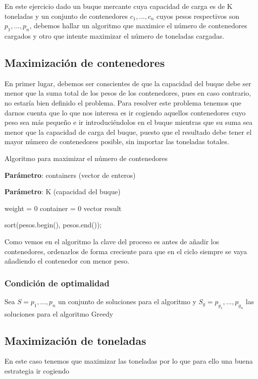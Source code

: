 En este ejercicio dado un buque mercante cuya capacidad de carga es de K toneladas y un conjunto de contenedores $c_1,...,c_n$ cuyos
pesos respectivos son $p_1,...,p_n$, debemos hallar un algoritmo que maximice el número de contenedores cargados y otro que intente 
maximizar el número de toneladas cargadas.

\subsection{Maximización de contenedores}

En primer lugar, debemos ser conscientes de que la capacidad del buque debe ser menor que la suma total de los pesos 
de los contenedores, pues en caso contrario, no estaría bien definido el problema. Para resolver este problema tenemos que darnos cuenta
que lo que nos interesa es ir cogiendo aquellos contenedores cuyo peso sea más pequeño e ir introduciéndolos en el buque mientras que su suma 
sea menor que la capacidad de carga del buque, puesto que el resultado debe tener el mayor número de contenedores posible, sin importar las 
toneladas totales. 

\begin{algorithm}[H]
    \caption{Algoritmo para maximizar el número de contenedores}\label{alg:max_containers}
    \begin{minipage}{0.92\textwidth}
    \textbf{Parámetro}: containers (vector de enteros)

    \textbf{Parámetro}: K (capacidad del buque)

    \end{minipage}

    weight = 0\;
	container = 0\;
    vector result\;
  
    sort(pesos.begin(), pesos.end());

  
    
\end{algorithm}

Como vemos en el algoritmo la clave del proceso es antes de añadir los contenedores, ordenarlos de forma creciente para que 
en el ciclo siempre se vaya añadiendo el contenedor con menor peso.

\subsubsection{Condición de optimalidad}
Sea $S = {p_1,...,p_n}$ un conjunto de soluciones para el algoritmo y $S_g = {p_{g_1},...,p_{g_n}}$ las soluciones para el algoritmo Greedy

\subsection{Maximización de toneladas}
En este caso tenemos que maximizar las toneladas por lo que para ello una buena estrategia ir cogiendo 